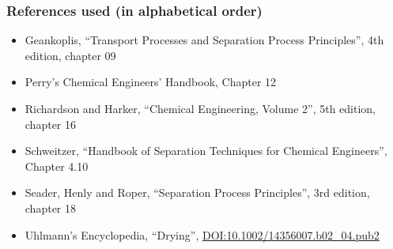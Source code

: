 

\begin{frame}\frametitle{References used (in alphabetical order)}
	\begin{itemize}
		\item	Geankoplis, ``Transport Processes and Separation Process Principles'', 4th edition, chapter 09
		\item	Perry's Chemical Engineers' Handbook, Chapter 12
		\item	Richardson and Harker, ``Chemical Engineering, Volume 2'', 5th edition, chapter 16	
		\item	Schweitzer, ``Handbook of Separation Techniques for Chemical Engineers'', Chapter 4.10
		\item	Seader, Henly and Roper, ``Separation Process Principles'', 3rd edition, chapter 18
		\item	Uhlmann's Encyclopedia, ``Drying'', {\tiny \href{http://dx.doi.org/10.1002/14356007.b02\_04.pub2}{DOI:10.1002/14356007.b02\_04.pub2}}
	\end{itemize}
\end{frame}